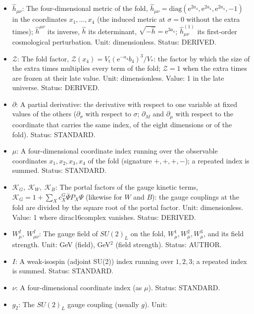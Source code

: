\documentclass[
  10pt,
]{article}
\providecommand{\tightlist}{%
  \setlength{\itemsep}{0pt}\setlength{\parskip}{0pt}}
\begin{document}
\begin{itemize}
\tightlist
\item
  \(\hat h_{\mu\nu}\): The four-dimensional metric of the fold,
  \(\hat h_{\mu\nu} = \mathrm{diag}(\mathrm{e}^{2a_4}, \mathrm{e}^{2a_4}, \mathrm{e}^{2a_4}, -1)\)
  in the coordinates \(x_1, \dots, x_4\) (the induced metric at
  \(\sigma = 0\) without the extra times); \(\hat h^{\mu\nu}\) its
  inverse, \(\hat h\) its determinant,
  \(\sqrt{-\hat h} = \mathrm{e}^{3a_4}\); \(\hat h^{(1)}_{\mu\nu}\) its
  first-order cosmological perturbation. Unit: dimensionless. Status:
  DERIVED.
\item
  \(\mathcal{Z}\): The fold factor,
  \(\mathcal{Z}(x_4) = V_{\mathrm{t}}(\mathrm{e}^{-a_4}b_4)^3/V_*\): the
  factor by which the size of the extra times multiplies every term of
  the fold; \(\mathcal{Z} = 1\) when the extra times are frozen at their
  late value. Unit: dimensionless. Value: 1 in the late universe.
  Status: DERIVED.
\item
  \(\partial\): A partial derivative: the derivative with respect to one
  variable at fixed values of the others (\(\partial_\sigma\) with
  respect to \(\sigma\); \(\partial_M\) and \(\partial_\mu\) with
  respect to the coordinate that carries the same index, of the eight
  dimensions or of the fold). Status: STANDARD.
\item
  \(\mu\): A four-dimensional coordinate index running over the
  observable coordinates \(x_1, x_2, x_3, x_4\) of the fold (signature
  \(+,+,+,-\)); a repeated index is summed. Status: STANDARD.
\item
  \(\mathcal{K}_{G},\ \mathcal{K}_{W},\ \mathcal{K}_{B}\): The portal
  factors of the gauge kinetic terms,
  \(\mathcal{K}_{G} = 1 + \sum_Xc^{G}_X\bar\Psi P_X\Psi\) (likewise for
  \(W\) and \(B\)): the gauge couplings at the fold are divided by the
  square root of the portal factor. Unit: dimensionless. Value: 1 where
  dirac16complex vanishes. Status: DERIVED.
\item
  \(W^I_\mu,\ W^I_{\mu\nu}\): The gauge field of \(SU(2)_L\) on the
  fold, \(W^1_\mu, W^2_\mu, W^3_\mu\), and its field strength. Unit: GeV
  (field), GeV\(^2\) (field strength). Status: AUTHOR.
\item
  \(I\): A weak-isospin (adjoint SU(2)) index running over \(1, 2, 3\);
  a repeated index is summed. Status: STANDARD.
\item
  \(\nu\): A four-dimensional coordinate index (as \(\mu\)). Status:
  STANDARD.
\item
  \(g_2\): The \(SU(2)_L\) gauge coupling (usually \(g\)). Unit:

\end{itemize}
\end{document}
